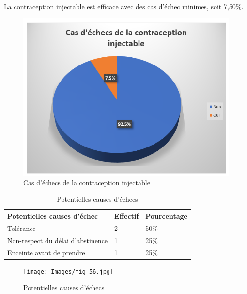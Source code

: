 \noindent La contraception injectable est efficace avec des cas d’échec minimes, soit 7,50\%. 

\begin{figure}[H]
  \centering
  \includegraphics[scale=1.1]{Images/fig_55.png}
  \caption{Cas d’échecs de la contraception injectable}
  
\end{figure}

\begin{table}[H]
  \centering
  \renewcommand{\arraystretch}{1.5}
  \caption{Potentielles causes d’échecs}
  \begin{spacing}{1.5} %
  \begin{tabularx}{\textwidth}{|p{8cm}|X|X|}
      \hline
      \rowcolor{customcolor}
      \textbf{\color{white}Potentielles causes d’échec} & \textbf{\color{white}Effectif} & \textbf{\color{white}Pourcentage}  \\
      \hline
      Tolérance& 2 & 50\% \\
      \hline
      Non-respect du délai d’abstinence  & 1 & 25\% \\
      \hline
      Enceinte avant de prendre & 1 & 25\% \\
      
      \hline
  \end{tabularx}
\end{spacing}

\end{table}

\begin{figure}[H]
  \centering
  \texttt{[image: Images/fig\_56.jpg]}
  \caption{Potentielles causes d’échecs}
  
\end{figure}


